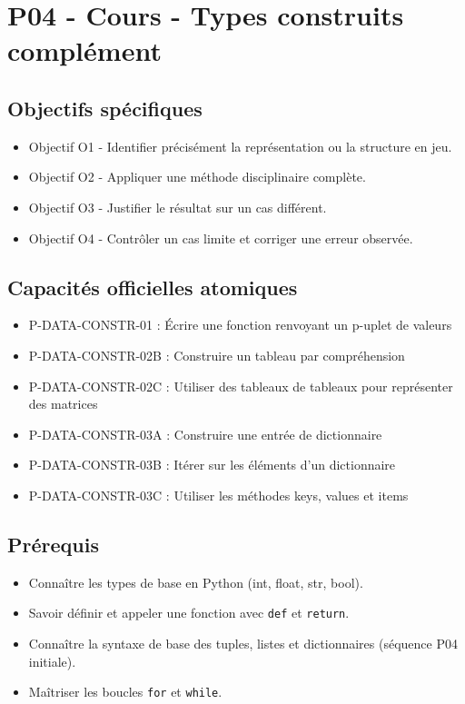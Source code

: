 \section{P04 - Cours - Types construits complément}

\subsection{Objectifs spécifiques}

\begin{itemize}
\tightlist
\item
  Objectif O1 - Identifier précisément la représentation ou la structure
  en jeu.
\item
  Objectif O2 - Appliquer une méthode disciplinaire complète.
\item
  Objectif O3 - Justifier le résultat sur un cas différent.
\item
  Objectif O4 - Contrôler un cas limite et corriger une erreur observée.
\end{itemize}

\subsection{Capacités officielles atomiques}

\begin{itemize}
\tightlist
\item
  P-DATA-CONSTR-01 : Écrire une fonction renvoyant un p-uplet de valeurs
\item
  P-DATA-CONSTR-02B : Construire un tableau par compréhension
\item
  P-DATA-CONSTR-02C : Utiliser des tableaux de tableaux pour représenter
  des matrices
\item
  P-DATA-CONSTR-03A : Construire une entrée de dictionnaire
\item
  P-DATA-CONSTR-03B : Itérer sur les éléments d'un dictionnaire
\item
  P-DATA-CONSTR-03C : Utiliser les méthodes keys, values et items
\end{itemize}

\subsection{Prérequis}

\begin{itemize}
\tightlist
\item
  Connaître les types de base en Python (int, float, str, bool).
\item
  Savoir définir et appeler une fonction avec \texttt{def} et
  \texttt{return}.
\item
  Connaître la syntaxe de base des tuples, listes et dictionnaires
  (séquence P04 initiale).
\item
  Maîtriser les boucles \texttt{for} et \texttt{while}.
\end{itemize}

